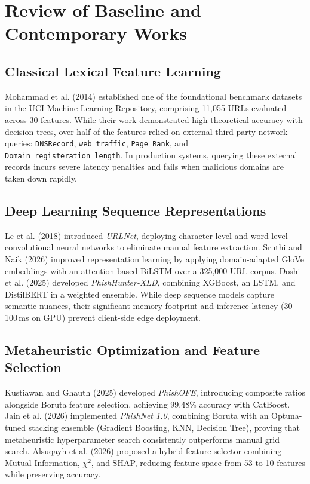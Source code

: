 \documentclass[12pt,a4paper,oneside]{report}
\begin{document}
\section{Review of Baseline and Contemporary Works}
\subsection{Classical Lexical Feature Learning}
Mohammad et al. (2014) \cite{mohammad2014} established one of the foundational benchmark datasets in the UCI Machine Learning Repository, comprising 11,055 URLs evaluated across 30 features. While their work demonstrated high theoretical accuracy with decision trees, over half of the features relied on external third-party network queries: \texttt{DNSRecord}, \texttt{web\_traffic}, \texttt{Page\_Rank}, and \texttt{Domain\_registeration\_length}. In production systems, querying these external records incurs severe latency penalties and fails when malicious domains are taken down rapidly.

\subsection{Deep Learning Sequence Representations}
Le et al. (2018) \cite{le2018urlnet} introduced \emph{URLNet}, deploying character-level and word-level convolutional neural networks to eliminate manual feature extraction. Sruthi and Naik (2026) \cite{sruthi2026} improved representation learning by applying domain-adapted GloVe embeddings with an attention-based BiLSTM over a 325,000 URL corpus. Doshi et al. (2025) \cite{doshi2025} developed \emph{PhishHunter-XLD}, combining XGBoost, an LSTM, and DistilBERT in a weighted ensemble. While deep sequence models capture semantic nuances, their significant memory footprint and inference latency (30--100\,ms on GPU) prevent client-side edge deployment.

\subsection{Metaheuristic Optimization and Feature Selection}
Kustiawan and Ghauth (2025) \cite{kustiawan2025} developed \emph{PhishOFE}, introducing composite ratios alongside Boruta feature selection, achieving 99.48\% accuracy with CatBoost. Jain et al. (2026) \cite{jain2026} implemented \emph{PhishNet 1.0}, combining Boruta with an Optuna-tuned stacking ensemble (Gradient Boosting, KNN, Decision Tree), proving that metaheuristic hyperparameter search consistently outperforms manual grid search. Alsuqayh et al. (2026) \cite{alsuqayh2026} proposed a hybrid feature selector combining Mutual Information, $\chi^2$, and SHAP, reducing feature space from 53 to 10 features while preserving accuracy.
\end{document}
